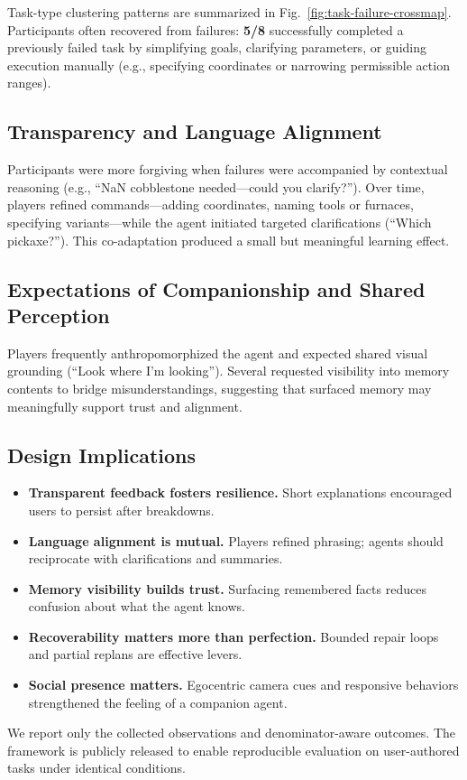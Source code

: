 \noindent
Task-type clustering patterns are summarized in Fig.~\ref{fig:task-failure-crossmap}. Participants often recovered from failures: \textbf{5/8} successfully completed a previously failed task by simplifying goals, clarifying parameters, or guiding execution manually (e.g., specifying coordinates or narrowing permissible action ranges).

\subsection{Transparency and Language Alignment}
Participants were more forgiving when failures were accompanied by contextual reasoning (e.g., “NaN cobblestone needed—could you clarify?”). Over time, players refined commands—adding coordinates, naming tools or furnaces, specifying variants—while the agent initiated targeted clarifications (“Which pickaxe?”). This co-adaptation produced a small but meaningful learning effect.

\subsection{Expectations of Companionship and Shared Perception}
Players frequently anthropomorphized the agent and expected shared visual grounding (“Look where I’m looking”). Several requested visibility into memory contents to bridge misunderstandings, suggesting that surfaced memory may meaningfully support trust and alignment.

\subsection{Design Implications}
\begin{itemize}[leftmargin=*,itemsep=2pt]
  \item \textbf{Transparent feedback fosters resilience.} Short explanations encouraged users to persist after breakdowns.
  \item \textbf{Language alignment is mutual.} Players refined phrasing; agents should reciprocate with clarifications and summaries.
  \item \textbf{Memory visibility builds trust.} Surfacing remembered facts reduces confusion about what the agent knows.
  \item \textbf{Recoverability matters more than perfection.} Bounded repair loops and partial replans are effective levers.
  \item \textbf{Social presence matters.} Egocentric camera cues and responsive behaviors strengthened the feeling of a companion agent.
\end{itemize}

\noindent
We report only the collected observations and denominator-aware outcomes. The framework is publicly released to enable reproducible evaluation on user-authored tasks under identical conditions.
